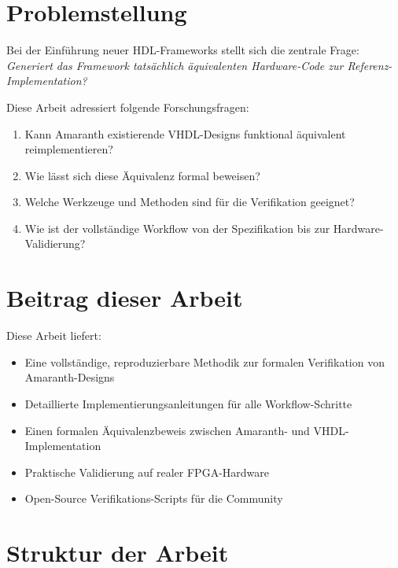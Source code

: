﻿\documentclass[12pt,a4paper]{report}
\begin{document}
\section{Problemstellung}

Bei der Einführung neuer HDL-Frameworks stellt sich die zentrale Frage: \textit{Generiert das Framework tatsächlich äquivalenten Hardware-Code zur Referenz-Implementation?}

Diese Arbeit adressiert folgende Forschungsfragen:

\begin{enumerate}
    \item Kann Amaranth existierende VHDL-Designs funktional äquivalent reimplementieren?
    \item Wie lässt sich diese Äquivalenz formal beweisen?
    \item Welche Werkzeuge und Methoden sind für die Verifikation geeignet?
    \item Wie ist der vollständige Workflow von der Spezifikation bis zur Hardware-Validierung?
\end{enumerate}

\section{Beitrag dieser Arbeit}

Diese Arbeit liefert:

\begin{itemize}
    \item Eine vollständige, reproduzierbare Methodik zur formalen Verifikation von Amaranth-Designs
    \item Detaillierte Implementierungsanleitungen für alle Workflow-Schritte
    \item Einen formalen Äquivalenzbeweis zwischen Amaranth- und VHDL-Implementation
    \item Praktische Validierung auf realer FPGA-Hardware
    \item Open-Source Verifikations-Scripts für die Community
\end{itemize}

\section{Struktur der Arbeit}
\end{document}
